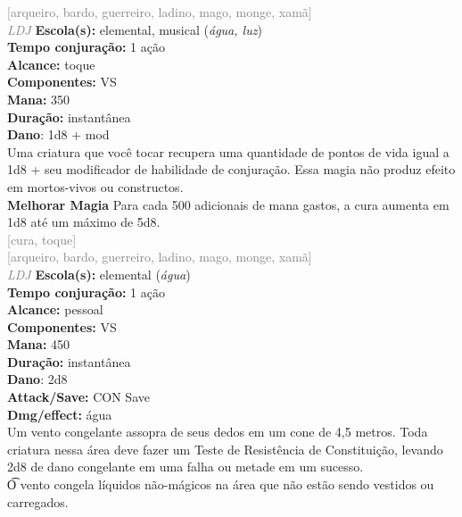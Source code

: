 \documentclass{RPG_Adventure}[2021/10/20]
\begin{document}
{\scriptsize \textcolor{gray}{[arqueiro, bardo, guerreiro, ladino, mago, monge, xamã]\\}}
{\tiny \textcolor{gray}{\textit{LDJ}}}\jump{}
{\small \t \textbf{Escola(s):} elemental, musical (\textit{água, luz})\\\t \textbf{Tempo conjuração:} 1 ação\\\t \textbf{Alcance:} toque\\\t \textbf{Componentes:} VS\\\t \textbf{Mana:} 350\\\t \textbf{Duração:} instantânea\\\t \textbf{Dano}: 1d8 + mod\\}
{\normalsize Uma criatura que você tocar recupera uma quantidade de pontos de vida igual a 1d8 + seu modificador de habilidade de conjuração. Essa magia não produz efeito em mortos-vivos ou constructos.\\\t \textbf{Melhorar Magia} Para cada 500 adicionais de mana gastos, a cura aumenta em 1d8 até um máximo de 5d8.\\}
{\scriptsize \textcolor{gray}{[cura, toque]\\}}
{\scriptsize \textcolor{gray}{[arqueiro, bardo, guerreiro, ladino, mago, monge, xamã]\\}}
{\tiny \textcolor{gray}{\textit{LDJ}}}\jump{}
{\small \t \textbf{Escola(s):} elemental (\textit{água})\\\t \textbf{Tempo conjuração:} 1 ação\\\t \textbf{Alcance:} pessoal\\\t \textbf{Componentes:} VS\\\t \textbf{Mana:} 450\\\t \textbf{Duração:} instantânea\\\t \textbf{Dano}: 2d8\\\t \textbf{Attack/Save:} CON Save\\\t \textbf{Dmg/effect:} água\\}
{\normalsize Um vento congelante assopra de seus dedos em um cone de 4,5 metros. Toda criatura nessa área deve fazer um Teste de Resistência de Constituição, levando 2d8 de dano congelante em uma falha ou metade em um sucesso.\\\t O vento congela líquidos não-mágicos na área que não estão sendo vestidos ou carregados.\\}
\end{document}
